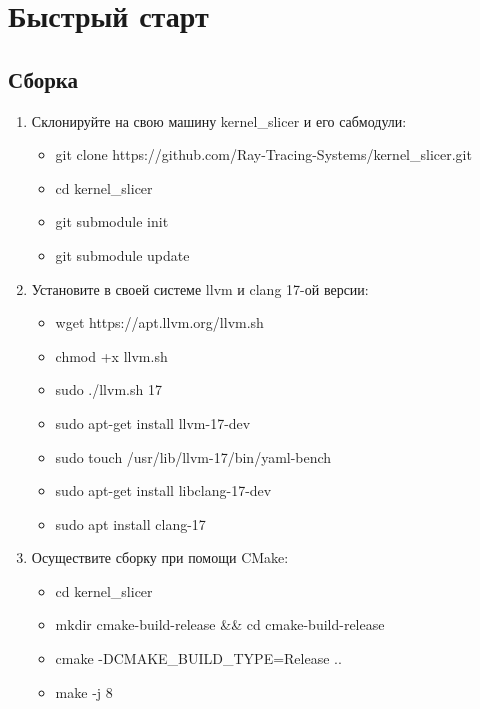 \documentclass[11pt,fleqn,english,russian]{report} %
\begin{document}


\chapter{Быстрый старт}

\section{Сборка}

\begin{enumerate}
	
\item Склонируйте на свою машину kernel\_slicer и его сабмодули: \begin{itemize}
	\item git clone https://github.com/Ray-Tracing-Systems/kernel\_slicer.git
	\item cd kernel\_slicer
	\item git submodule init
	\item git submodule update
\end{itemize}

\item Установите в своей системе llvm и clang 17-ой версии: \begin{itemize}
	\item wget https://apt.llvm.org/llvm.sh
	\item chmod +x llvm.sh
	\item sudo ./llvm.sh 17
	\item sudo apt-get install llvm-17-dev
	\item sudo touch /usr/lib/llvm-17/bin/yaml-bench
	\item sudo apt-get install libclang-17-dev
	\item sudo apt install clang-17
\end{itemize}

\item Осуществите сборку при помощи CMake: 
\begin{itemize}
	\item cd kernel\_slicer
    \item mkdir cmake-build-release \&\& cd cmake-build-release
    \item cmake -DCMAKE\_BUILD\_TYPE=Release .. 
    \item make -j 8
\end{itemize}

\end{enumerate}
\end{document}

